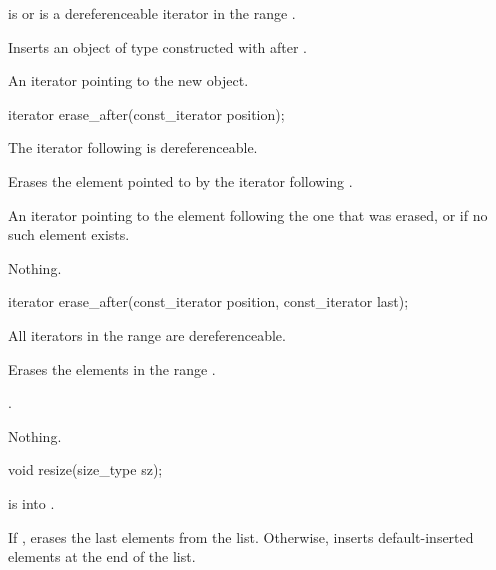 \begin{itemdescr}
\pnum
\expects
{} is  or is a dereferenceable
iterator in the range .

\pnum
\effects
Inserts an object of type  constructed with
 after .

\pnum
\returns
An iterator pointing to the new object.
\end{itemdescr}

%
\begin{itemdecl}
iterator erase_after(const_iterator position);
\end{itemdecl}

\begin{itemdescr}
\pnum
\expects
The iterator following  is dereferenceable.

\pnum
\effects
Erases the element pointed to by the iterator following .

\pnum
\returns
An iterator pointing to the element following the one that was
erased, or  if no such element exists.

\pnum
\throws
Nothing.
\end{itemdescr}

\begin{itemdecl}
iterator erase_after(const_iterator position, const_iterator last);
\end{itemdecl}

\begin{itemdescr}
\pnum
\expects
All iterators in the range  are dereferenceable.

\pnum
\effects
Erases the elements in the range .

\pnum
\returns
{}.

\pnum
\throws
Nothing.
\end{itemdescr}

%
\begin{itemdecl}
void resize(size_type sz);
\end{itemdecl}

\begin{itemdescr}
\pnum
\expects
{} is  into .

\pnum
\effects
If , erases the last  elements from the list. Otherwise, inserts  default-inserted
elements at the end of the list.
\end{itemdescr}

